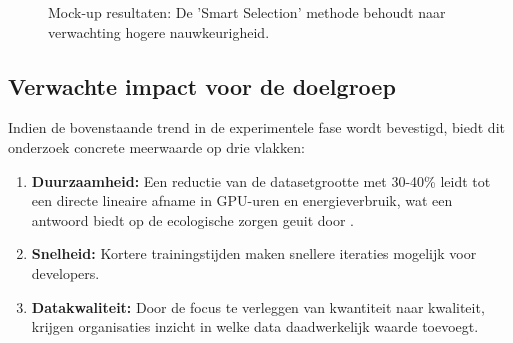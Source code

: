 \begin{figure}[h]
\centering
\caption{Mock-up resultaten: De 'Smart Selection' methode behoudt naar verwachting hogere nauwkeurigheid.}
\label{fig:mockup_results}
\end{figure}

\subsection{Verwachte impact voor de doelgroep}
Indien de bovenstaande trend in de experimentele fase wordt bevestigd, biedt dit onderzoek concrete meerwaarde op drie vlakken:
\begin{enumerate}
    \item \textbf{Duurzaamheid:} Een reductie van de datasetgrootte met 30-40\% leidt tot een directe lineaire afname in GPU-uren en energieverbruik, wat een antwoord biedt op de ecologische zorgen geuit door \textcite{strubell2019energy}.
    \item \textbf{Snelheid:} Kortere trainingstijden maken snellere iteraties mogelijk voor developers.
    \item \textbf{Datakwaliteit:} Door de focus te verleggen van kwantiteit naar kwaliteit, krijgen organisaties inzicht in welke data daadwerkelijk waarde toevoegt.
\end{enumerate}

